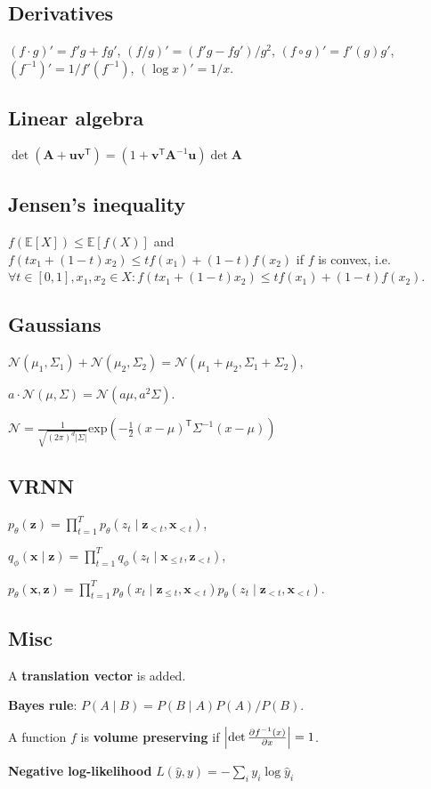 \documentclass[11pt,landscape,a4paper,fleqn]{article}
\newcommand*{\tran}{^{\mathsf{T}}} %
\newcommand{\E}{\mathbb{E}}
\renewcommand{\exp}{\mathrm{exp}}
\def\myvector#1{\mathbf{#1}}
\def\vu{{\myvector{u}}}
\def\vv{{\myvector{v}}}
\def\vx{{\myvector{x}}}
\def\vz{{\myvector{z}}}
\def\mymatrix#1{\mathbf{#1}}
\def\mA{{\mymatrix{A}}}
\begin{document}
\begin{multicols*}{4}
\subsection*{Derivatives}

$(f \cdot g)' = f'g + fg'$,
$(f / g)' = (f'g - fg') / g^2$,
$(f \circ g)' = f'(g)g'$,
$(f^{-1})' = 1 / f'(f^{-1})$,
$(\log x)' = 1 / x$.

\subsection*{Linear algebra}

$\det(\mA + \vu\vv\tran) = (1 + \vv\tran \mA^{-1}\vu) \det \mA$

\subsection*{Jensen's inequality}
$f(\E[X]) \leq \E[f(X)]$ and $f(tx_1 + (1 - t)x_2) \leq tf(x_1) + (1 - t)f(x_2)$ if $f$ is convex, i.e. $\forall t \in [0, 1], x_1, x_2 \in X : f(tx_1 + (1 - t)x_2) \leq tf(x_1) + (1 - t)f(x_2)$.

\subsection*{Gaussians}

$\mathcal{N}(\mu_1, \Sigma_1) + \mathcal{N}(\mu_2, \Sigma_2)
= \mathcal{N}(\mu_1 + \mu_2, \Sigma_1 + \Sigma_2)$,

$a \cdot \mathcal{N}(\mu, \Sigma) = \mathcal{N}(a\mu, a^2\Sigma)$.

$\mathcal{N} = \frac{1}{\sqrt{(2\pi)^d |\Sigma|}} \exp( - \frac{1}{2} (x - \mu)\tran \Sigma^{-1} (x - \mu))$

\subsection*{VRNN}

$p_\theta(\vz) = \prod_{t = 1}^T p_\theta(z_t \mid \vz_{ < t}, \vx_{ < t})$,

$q_\phi(\vx \mid \vz) = \prod_{t = 1}^T q_\phi(z_t \mid \vx_{ \leq t}, \vz_{ < t})$,

$p_\theta(\vx, \vz) = \prod_{t = 1}^T p_\theta(x_t \mid \vz_{ \leq t}, \vx_{ < t})p_\theta(z_t \mid \vz_{ < t}, \vx_{ < t})$.

\subsection*{Misc}
A \textbf{translation vector} is added.

\textbf{Bayes rule}:
$P(A \mid B) = P(B \mid A)P(A) / P(B)$.

A function $f$ is \textbf{volume preserving} if $\left|\det \pdv{f^{-1}(x)}{x}\right| = 1$.

\textbf{Negative log-likelihood} $L(\hat{y}, y) = - \sum_i y_i \log \hat{y}_i$

\end{multicols*}
\end{document}
